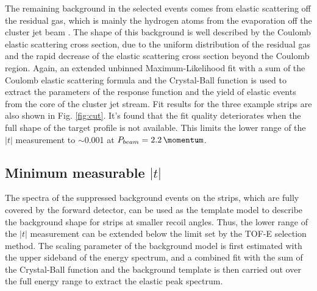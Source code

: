 \documentclass[number,5p]{elsarticle}
\begin{document}
The remaining background in the selected events comes from elastic scattering
off the residual gas, which is mainly the hydrogen atoms from the evaporation
off the cluster jet beam \cite{cluster_target}.
The shape of this background is well described by the Coulomb elastic scattering cross
section, due to the uniform distribution of the residual gas and the rapid decrease of the elastic scattering cross section beyond the Coulomb region.
Again, an extended unbinned Maximum-Likelihood fit with a sum of the Coulomb elastic scattering formula and the Crystal-Ball
function is used to extract the parameters of the response function and the
yield of elastic events from the core of the cluster jet stream. 
Fit results for the three example strips are also shown in Fig. \ref{fig:cut}.
It's found that the fit quality deteriorates when the full shape of the target profile is not available.
This limits the lower range of the $|t|$ measurement to $\sim$\SI{0.001}{\tmom} at $P_{beam}=\SI{2.2}{\momentum}$.

\subsection{Minimum measurable $|t|$}
\label{sec:minimum_t}
The spectra of the suppressed background events on the strips, which are fully covered by the
forward detector, can be used as the template model to describe the background
shape for strips at smaller recoil angles.
Thus, the lower range of the $|t|$ measurement can be extended below the limit set by the TOF-E selection method.
The scaling parameter of the background model is first estimated with the upper
sideband of the energy spectrum, and a combined fit with the sum of the Crystal-Ball function and the background template is then carried
out over the full energy range to extract the elastic peak spectrum.
\end{document}
